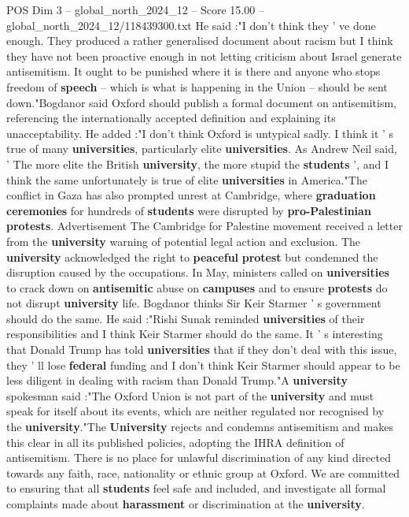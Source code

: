 \begin{textsample}{POS Dim 3 – global\_north\_2024\_12 – Score 15.00 – global\_north\_2024\_12/118439300.txt}
He said :"I don't think they ' ve done enough.
They produced a rather generalised document about racism but I think they have not been proactive enough in not letting criticism about Israel generate antisemitism.
It ought to be punished where it is there and anyone who stops freedom of \textbf{speech} -- which is what is happening in the Union -- should be sent down."Bogdanor said Oxford should publish a formal document on antisemitism, referencing the internationally accepted definition and explaining its unacceptability.
He added :"I don't think Oxford is untypical sadly.
I think it ' s true of many \textbf{universities}, particularly elite \textbf{universities}.
As Andrew Neil said, ' The more elite the British \textbf{university}, the more stupid the \textbf{students} ', and I think the same unfortunately is true of elite \textbf{universities} in America."The conflict in Gaza has also prompted unrest at Cambridge, where \textbf{graduation} \textbf{ceremonies} for hundreds of \textbf{students} were disrupted by \textbf{pro-Palestinian} \textbf{protests}.
Advertisement The Cambridge for Palestine movement received a letter from the \textbf{university} warning of potential legal action and exclusion.
The \textbf{university} acknowledged the right to \textbf{peaceful} \textbf{protest} but condemned the disruption caused by the occupations.
In May, ministers called on \textbf{universities} to crack down on \textbf{antisemitic} abuse on \textbf{campuses} and to ensure \textbf{protests} do not disrupt \textbf{university} life.
Bogdanor thinks Sir Keir Starmer ' s government should do the same.
He said :"Rishi Sunak reminded \textbf{universities} of their responsibilities and I think Keir Starmer should do the same.
It ' s interesting that Donald Trump has told \textbf{universities} that if they don't deal with this issue, they ' ll lose \textbf{federal} funding and I don't think Keir Starmer should appear to be less diligent in dealing with racism than Donald Trump."A \textbf{university} spokesman said :"The Oxford Union is not part of the \textbf{university} and must speak for itself about its events, which are neither regulated nor recognised by the \textbf{university}."The \textbf{University} rejects and condemns antisemitism and makes this clear in all its published policies, adopting the IHRA definition of antisemitism.
There is no place for unlawful discrimination of any kind directed towards any faith, race, nationality or ethnic group at Oxford.
We are committed to ensuring that all \textbf{students} feel safe and included, and investigate all formal complaints made about \textbf{harassment} or discrimination at the \textbf{university}.

\end{textsample}
